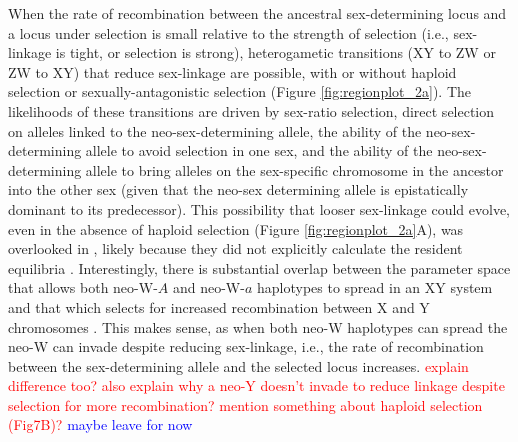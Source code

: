\documentclass[12pt]{article}
\begin{document}
When the rate of recombination between the ancestral sex-determining locus and a locus under selection is small relative to the strength of selection (i.e., sex-linkage is tight, or selection is strong), heterogametic transitions (XY to ZW or ZW to XY) that reduce sex-linkage are possible, with or without haploid selection or sexually-antagonistic selection (Figure \ref{fig:regionplot_2a}).
The likelihoods of these transitions are driven by sex-ratio selection, direct selection on alleles linked to the neo-sex-determining allele, the ability of the neo-sex-determining allele to avoid selection in one sex, and the ability of the neo-sex-determining allele to bring alleles on the sex-specific chromosome in the ancestor into the other sex (given that the neo-sex determining allele is epistatically dominant to its predecessor).
This possibility that looser sex-linkage could evolve, even in the absence of haploid selection (Figure \ref{fig:regionplot_2a}A), was overlooked in \cite{vanDoorn:2010hu}, likely because they did not explicitly calculate the resident equilibria \citep[equation \ref{eq:tightequil};][]{Lloyd1977,Otto2014}.
Interestingly, there is substantial overlap between the parameter space that allows both neo-W-$A$ and neo-W-$a$ haplotypes to spread in an XY system and that which selects for increased recombination between X and Y chromosomes \citep[e.g., compare gray region of Figure \ref{fig:regionplot_2a}A with coloured regions of Figure 2(a) in][]{Otto2014}.
This makes sense, as when both neo-W haplotypes can spread the neo-W can invade despite reducing sex-linkage, i.e., the rate of recombination between the sex-determining allele and the selected locus increases.
\textcolor{red}{explain difference too? also explain why a neo-Y doesn't invade to reduce linkage despite selection for more recombination? mention something about haploid selection (Fig7B)?} \textcolor{blue}{maybe leave for now}
\end{document}
